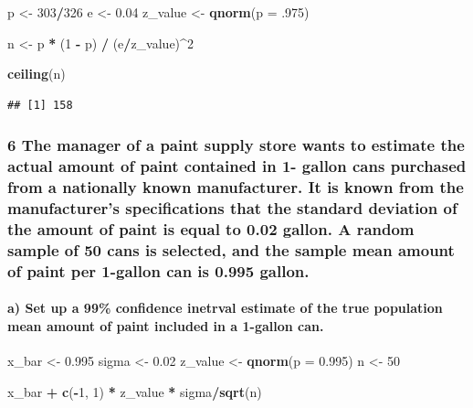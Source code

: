 \documentclass[]{article}
\newenvironment{Shaded}{\begin{snugshade}}{\end{snugshade}}
\newcommand{\KeywordTok}[1]{\textcolor[rgb]{0.13,0.29,0.53}{\textbf{#1}}}
\newcommand{\DataTypeTok}[1]{\textcolor[rgb]{0.13,0.29,0.53}{#1}}
\newcommand{\DecValTok}[1]{\textcolor[rgb]{0.00,0.00,0.81}{#1}}
\newcommand{\FloatTok}[1]{\textcolor[rgb]{0.00,0.00,0.81}{#1}}
\newcommand{\StringTok}[1]{\textcolor[rgb]{0.31,0.60,0.02}{#1}}
\newcommand{\OperatorTok}[1]{\textcolor[rgb]{0.81,0.36,0.00}{\textbf{#1}}}
\newcommand{\NormalTok}[1]{#1}
\let\oldparagraph\paragraph
\renewcommand{\paragraph}[1]{\oldparagraph{#1}\mbox{}}
\begin{document}
\begin{Shaded}
\begin{Highlighting}[]
\NormalTok{p <-}\StringTok{ }\DecValTok{303}\OperatorTok{/}\DecValTok{326}
\NormalTok{e <-}\StringTok{ }\FloatTok{0.04}
\NormalTok{z_value <-}\StringTok{ }\KeywordTok{qnorm}\NormalTok{(}\DataTypeTok{p =}\NormalTok{ .}\DecValTok{975}\NormalTok{)}

\NormalTok{n <-}\StringTok{ }\NormalTok{p }\OperatorTok{*}\StringTok{ }\NormalTok{(}\DecValTok{1} \OperatorTok{-}\StringTok{ }\NormalTok{p) }\OperatorTok{/}\StringTok{ }\NormalTok{(e}\OperatorTok{/}\NormalTok{z_value)}\OperatorTok{^}\DecValTok{2}

\KeywordTok{ceiling}\NormalTok{(n)}
\end{Highlighting}
\end{Shaded}

\begin{verbatim}
## [1] 158
\end{verbatim}

\subsubsection{6 The manager of a paint supply store wants to estimate
the actual amount of paint contained in 1- gallon cans purchased from a
nationally known manufacturer. It is known from the manufacturer's
specifications that the standard deviation of the amount of paint is
equal to 0.02 gallon. A random sample of 50 cans is selected, and the
sample mean amount of paint per 1-gallon can is 0.995
gallon.}\label{the-manager-of-a-paint-supply-store-wants-to-estimate-the-actual-amount-of-paint-contained-in-1--gallon-cans-purchased-from-a-nationally-known-manufacturer.-it-is-known-from-the-manufacturers-specifications-that-the-standard-deviation-of-the-amount-of-paint-is-equal-to-0.02-gallon.-a-random-sample-of-50-cans-is-selected-and-the-sample-mean-amount-of-paint-per-1-gallon-can-is-0.995-gallon.}

\paragraph{a) Set up a 99\% confidence inetrval estimate of the true
population mean amount of paint included in a 1-gallon
can.}\label{a-set-up-a-99-confidence-inetrval-estimate-of-the-true-population-mean-amount-of-paint-included-in-a-1-gallon-can.}

\begin{Shaded}
\begin{Highlighting}[]
\NormalTok{x_bar <-}\StringTok{ }\FloatTok{0.995}
\NormalTok{sigma <-}\StringTok{ }\FloatTok{0.02}
\NormalTok{z_value <-}\StringTok{ }\KeywordTok{qnorm}\NormalTok{(}\DataTypeTok{p =} \FloatTok{0.995}\NormalTok{)}
\NormalTok{n <-}\StringTok{ }\DecValTok{50}

\NormalTok{x_bar }\OperatorTok{+}\StringTok{ }\KeywordTok{c}\NormalTok{(}\OperatorTok{-}\DecValTok{1}\NormalTok{, }\DecValTok{1}\NormalTok{) }\OperatorTok{*}\StringTok{ }\NormalTok{z_value }\OperatorTok{*}\StringTok{ }\NormalTok{sigma}\OperatorTok{/}\KeywordTok{sqrt}\NormalTok{(n)}
\end{Highlighting}
\end{Shaded}
\end{document}
